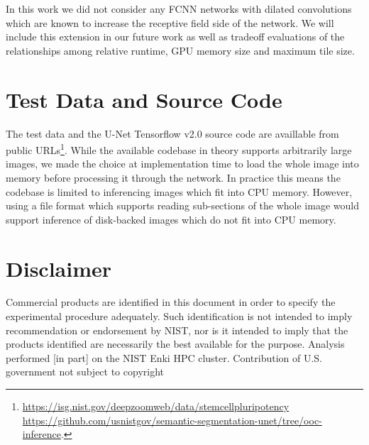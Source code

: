 \documentclass[runningheads]{llncs}
\begin{document}
In this work we did not consider any FCNN networks with dilated convolutions which are known to increase the receptive field side of the network. We will include this extension in our future work as well as tradeoff evaluations of the relationships among relative runtime, GPU memory size and maximum tile size.




\section{Test Data and Source Code}
The test data and the U-Net Tensorflow v2.0 source code are availlable from public URLs\footnote{ 
\url{https://isg.nist.gov/deepzoomweb/data/stemcellpluripotency} 
\url{https://github.com/usnistgov/semantic-segmentation-unet/tree/ooc-inference}.
}.
While the available codebase in theory supports arbitrarily large images, we made the choice at implementation time to load the whole image into memory before processing it through the network. In practice this means the codebase is limited to inferencing images which fit into CPU memory. However, using a file format which supports reading sub-sections of the whole image would support inference of disk-backed images which do not fit into CPU memory. 

\section{Disclaimer}

Commercial products are identified in this document in order to specify the experimental procedure adequately. Such identification is not intended to imply recommendation or endorsement by NIST, nor is it intended to imply that the products identified are necessarily the best available for the purpose. Analysis performed [in part] on the NIST Enki HPC cluster. Contribution of U.S. government not subject to copyright


\clearpage
%
%
{\fontsize{9.0pt}{10.0pt} 
\selectfont



\clearpage

}
\end{document}
